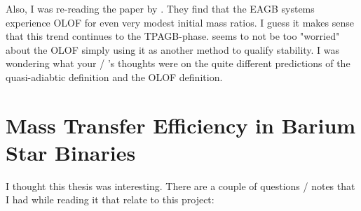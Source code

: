 \documentclass[a4paper,10pt]{article}
\begin{document}
    Also, I was re-reading the paper by \citet{temmink2022}. They find that the EAGB systems experience OLOF for even very modest initial mass ratios. I guess it makes sense that this trend continues to the TPAGB-phase. \citet{temmink2022} seems to not be too "worried" about the OLOF simply using it as another method to qualify stability. I was wondering what your / \citeauthor{temmink2022}'s thoughts were on the quite different predictions of the quasi-adiabtic definition and the OLOF definition.

\section{Mass Transfer Efficiency in Barium Star Binaries}

I thought this thesis was interesting. There are a couple of questions / notes that I had while reading it that relate to this project:
\end{document}
